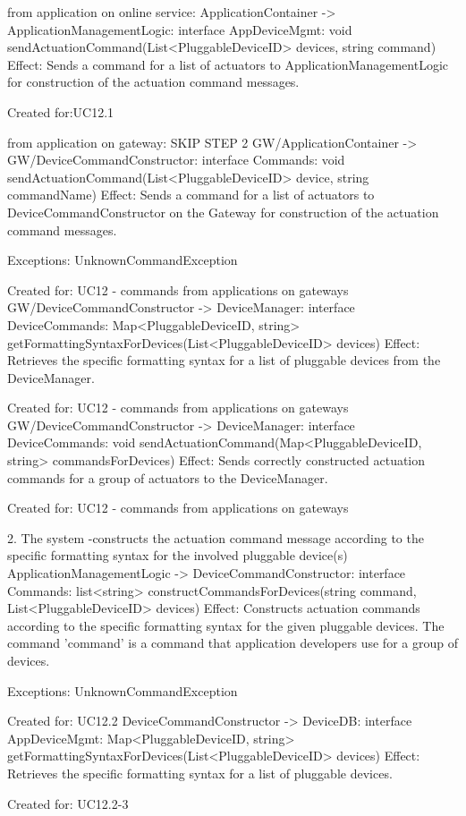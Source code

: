                 from application on online service:
                    ApplicationContainer -> ApplicationManagementLogic: interface AppDeviceMgmt: void sendActuationCommand(List<PluggableDeviceID> devices, string command)
                        Effect: Sends a command for a list of actuators to ApplicationManagementLogic for construction of the actuation command messages.
                        \item Created for:UC12.1

                from application on gateway: SKIP STEP 2
                    GW/ApplicationContainer -> GW/DeviceCommandConstructor: interface Commands: void sendActuationCommand(List<PluggableDeviceID> device, string commandName)
                        Effect: Sends a command for a list of actuators to DeviceCommandConstructor on the Gateway for construction of the actuation command messages.
                        \item Exceptions: UnknownCommandException
                        \item Created for: UC12 - commands from applications on gateways
                    GW/DeviceCommandConstructor -> DeviceManager: interface DeviceCommands: Map<PluggableDeviceID, string> getFormattingSyntaxForDevices(List<PluggableDeviceID> devices)
                        Effect: Retrieves the specific formatting syntax for a list of pluggable devices from the DeviceManager.
                        \item Created for: UC12 - commands from applications on gateways
                    GW/DeviceCommandConstructor -> DeviceManager: interface DeviceCommands: void sendActuationCommand(Map<PluggableDeviceID, string> commandsForDevices)
                        Effect: Sends correctly constructed actuation commands for a group of actuators to the DeviceManager.
                        \item Created for: UC12 - commands from applications on gateways


            2. The system
                -constructs the actuation command message according to the specific formatting syntax for the involved pluggable device(s)
                    ApplicationManagementLogic -> DeviceCommandConstructor:  interface Commands:  list<string> constructCommandsForDevices(string command, List<PluggableDeviceID> devices)
                        Effect: Constructs actuation commands according to the specific formatting syntax for the given pluggable devices. The command 'command' is a command that application developers use for a group of devices.
                        \item Exceptions: UnknownCommandException
                        \item Created for: UC12.2
                    DeviceCommandConstructor -> DeviceDB: interface AppDeviceMgmt: Map<PluggableDeviceID, string> getFormattingSyntaxForDevices(List<PluggableDeviceID> devices)
                        Effect: Retrieves the specific formatting syntax for a list of pluggable devices.
                        \item Created for: UC12.2-3

